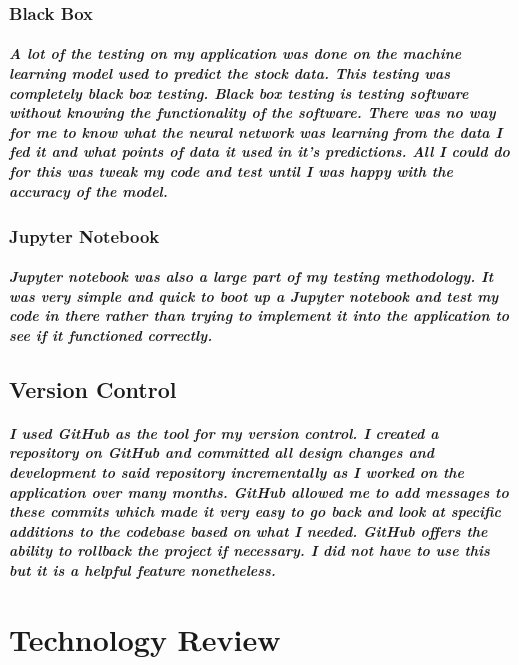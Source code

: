 \subsection{Black Box}
\paragraph{A lot of the testing on my application was done on the machine learning model used to predict the stock data. This testing was completely black box testing. Black box testing is testing software without knowing the functionality of the software. There was no way for me to know what the neural network was learning from the data I fed it and what points of data it used in it's predictions. All I could do for this was tweak my code and test until I was happy with the accuracy of the model.}

\subsection{Jupyter Notebook}
\paragraph{Jupyter notebook was also a large part of my testing methodology. It was very simple and quick to boot up a Jupyter notebook and test my code in there rather than trying to implement it into the application to see if it functioned correctly.}

\section{Version Control}
\paragraph{I used GitHub as the tool for my version control. I created a repository on GitHub and committed all design changes and development to said repository incrementally as I worked on the application over many months. GitHub allowed me to add messages to these commits which made it very easy to go back and look at specific additions to the codebase based on what I needed. GitHub offers the ability to rollback the project if necessary. I did not have to use this but it is a helpful feature nonetheless.}





\chapter{Technology Review}

